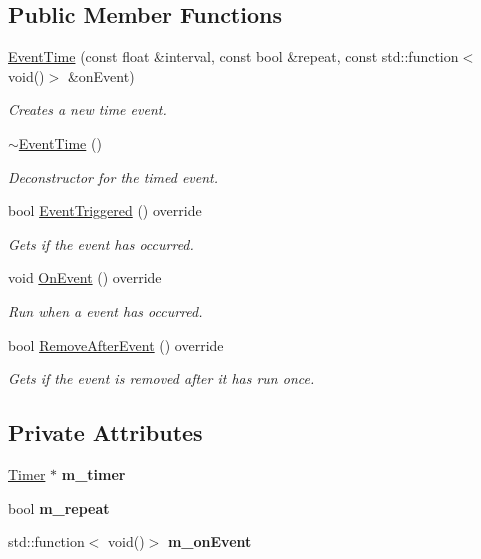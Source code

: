 \subsection*{Public Member Functions}
\begin{DoxyCompactItemize}
\item 
\hyperlink{class_flounder_1_1_event_time_a2991c537800ea29894efe58044dc948c}{Event\+Time} (const float \&interval, const bool \&repeat, const std\+::function$<$ void()$>$ \&on\+Event)
\begin{DoxyCompactList}\small\item\em Creates a new time event. \end{DoxyCompactList}\item 
\hyperlink{class_flounder_1_1_event_time_ad990b345703ae156c066ffd81ea05e91}{$\sim$\+Event\+Time} ()
\begin{DoxyCompactList}\small\item\em Deconstructor for the timed event. \end{DoxyCompactList}\item 
bool \hyperlink{class_flounder_1_1_event_time_a4651610c70a6a869c0f6c223d8f7eb52}{Event\+Triggered} () override
\begin{DoxyCompactList}\small\item\em Gets if the event has occurred. \end{DoxyCompactList}\item 
void \hyperlink{class_flounder_1_1_event_time_abeafc8779ee5be6e8b4ec701029fb15e}{On\+Event} () override
\begin{DoxyCompactList}\small\item\em Run when a event has occurred. \end{DoxyCompactList}\item 
bool \hyperlink{class_flounder_1_1_event_time_a58f3a1e64668b27e3395d95a7432181a}{Remove\+After\+Event} () override
\begin{DoxyCompactList}\small\item\em Gets if the event is removed after it has run once. \end{DoxyCompactList}\end{DoxyCompactItemize}
\subsection*{Private Attributes}
\begin{DoxyCompactItemize}
\item 
\mbox{\label{class_flounder_1_1_event_time_a0b2a68b4f1b5a7eb12cd3ffecb2e2b10}} 
\hyperlink{class_flounder_1_1_timer}{Timer} $\ast$ {\bfseries m\+\_\+timer}
\item 
\mbox{\label{class_flounder_1_1_event_time_abd9f199b202d2bbdb081d33c2f55b932}} 
bool {\bfseries m\+\_\+repeat}
\item 
\mbox{\label{class_flounder_1_1_event_time_a19bff0599a1d2cb25923dbd31e542686}} 
std\+::function$<$ void()$>$ {\bfseries m\+\_\+on\+Event}
\end{DoxyCompactItemize}


